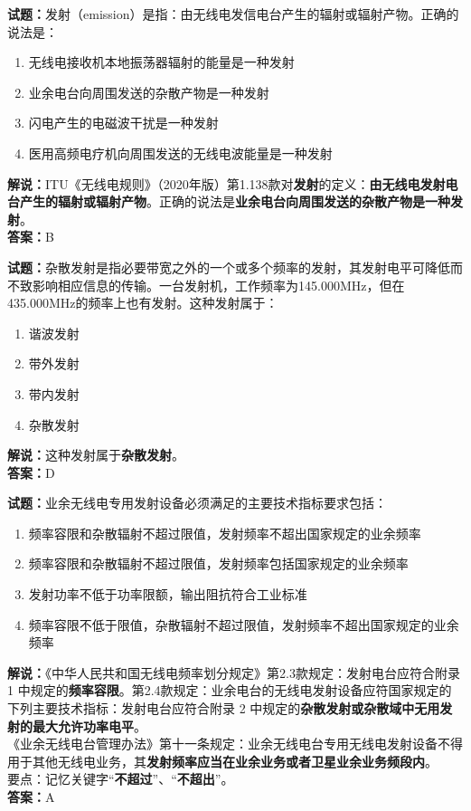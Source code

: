 \documentclass{ctexbook}
\begin{document}
\bigskip


\noindent\textbf{试题：}发射（emission）是指：由无线电发信电台产生的辐射或辐射产物。正确的说法是：
\begin{enumerate}[leftmargin=3em]
	\item 无线电接收机本地振荡器辐射的能量是一种发射
	\item 业余电台向周围发送的杂散产物是一种发射
	\item 闪电产生的电磁波干扰是一种发射
	\item 医用高频电疗机向周围发送的无线电波能量是一种发射
\end{enumerate}
\noindent\textbf{解说：}ITU《无线电规则》（2020年版）第1.138款对\textbf{发射}的定义：\textbf{由无线电发射电台产生的辐射或辐射产物}。正确的说法是\textbf{业余电台向周围发送的杂散产物是一种发射}。\\\noindent\textbf{答案：}B


\bigskip


\noindent\textbf{试题：}杂散发射是指必要带宽之外的一个或多个频率的发射，其发射电平可降低而不致影响相应信息的传输。一台发射机，工作频率为145.000MHz，但在435.000MHz的频率上也有发射。这种发射属于：
\begin{enumerate}[leftmargin=3em]
	\item 谐波发射
	\item 带外发射
	\item 带内发射
	\item 杂散发射
\end{enumerate}
\noindent\textbf{解说：}这种发射属于\textbf{杂散发射}。\\\noindent\textbf{答案：}D




\bigskip


\noindent\textbf{试题：}业余无线电专用发射设备必须满足的主要技术指标要求包括：
\begin{enumerate}[leftmargin=3em]
	\item 频率容限和杂散辐射不超过限值，发射频率不超出国家规定的业余频率
	\item 频率容限和杂散辐射不超过限值，发射频率包括国家规定的业余频率
	\item 发射功率不低于功率限额，输出阻抗符合工业标准
	\item 频率容限不低于限值，杂散辐射不超过限值，发射频率不超出国家规定的业余频率
\end{enumerate}
\noindent\textbf{解说：}《中华人民共和国无线电频率划分规定》第2.3款规定：发射电台应符合附录 1 中规定的\textbf{频率容限}。第2.4款规定：业余电台的无线电发射设备应符国家规定的下列主要技术指标：发射电台应符合附录 2 中规定的\textbf{杂散发射或杂散域中无用发射的最大允许功率电平}。\\《业余无线电台管理办法》第十一条规定：业余无线电台专用无线电发射设备不得用于其他无线电业务，其\textbf{发射频率应当在业余业务或者卫星业余业务频段内}。\\要点：记忆关键字“\textbf{不超过}”、“\textbf{不超出}”。\\\noindent\textbf{答案：}A
\end{document}
